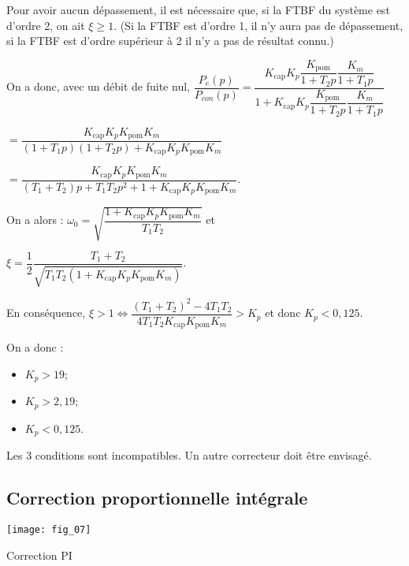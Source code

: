 \ifprof
\begin{corrige}
Pour avoir aucun dépassement, il est nécessaire que, si la FTBF du système est d'ordre 2, on ait $\xi\geq 1$. (Si la FTBF est d'ordre 1, il n'y aura pas de dépassement, si la FTBF est d'ordre supérieur à 2 il n'y a pas de résultat connu.)

On a donc, avec un débit de fuite nul, $\dfrac{P_e(p)}{P_{con}(p)}
=\dfrac{K_{\text{cap}}K_p\dfrac{K_{\text{pom}}}{1+T_2 p}\dfrac{K_{m}}{1+T_1 p}}{1+K_{\text{cap}}K_p\dfrac{K_{\text{pom}}}{1+T_2 p}\dfrac{K_{m}}{1+T_1 p}}$

$=\dfrac{K_{\text{cap}}K_pK_{\text{pom}} K_{m}}{\left(1+T_1 p\right)\left(1+T_2 p\right)+K_{\text{cap}}K_pK_{\text{pom}} K_{m}}$


$=\dfrac{
K_{\text{cap}}K_pK_{\text{pom}} K_{m}
}{
\left(T_1 +  T_2\right) p + T_1T_2 p^2+1+K_{\text{cap}}K_pK_{\text{pom}} K_{m}
}$.

On a alors : $\omega_0 = \sqrt{\dfrac{1+K_{\text{cap}}K_pK_{\text{pom}} K_{m}}{T_1T_2}}$
et

$\xi=\dfrac{1}{2}\dfrac{T_1+T_2}{\sqrt{T_1T_2 \left(1+K_{\text{cap}}K_pK_{\text{pom}} K_{m}\right)}}$.
 
En conséquence, $\xi>1\Leftrightarrow \dfrac{\left(T_1+T_2\right)^2-4T_1T_2 }{4T_1T_2 K_{\text{cap}}K_{\text{pom}} K_{m}} > K_p $ et donc $K_p<0,125 $.

\end{corrige}
\else
\fi


\ifprof
\begin{corrige}
On a donc : 
\begin{itemize}
\item $K_p>19$;
\item $K_p> 2,19$;
\item $K_p<0,125 $.
\end{itemize}
Les 3 conditions sont incompatibles. Un autre correcteur doit être envisagé.
\end{corrige}

\else
\fi


\clearpage

\subsection*{Correction proportionnelle intégrale}
\begin{marginfigure}
\texttt{[image: fig\_07]}
\caption{Correction PI \label{Cy_03_01_TD_PI_04:fig}}
\end{marginfigure}


